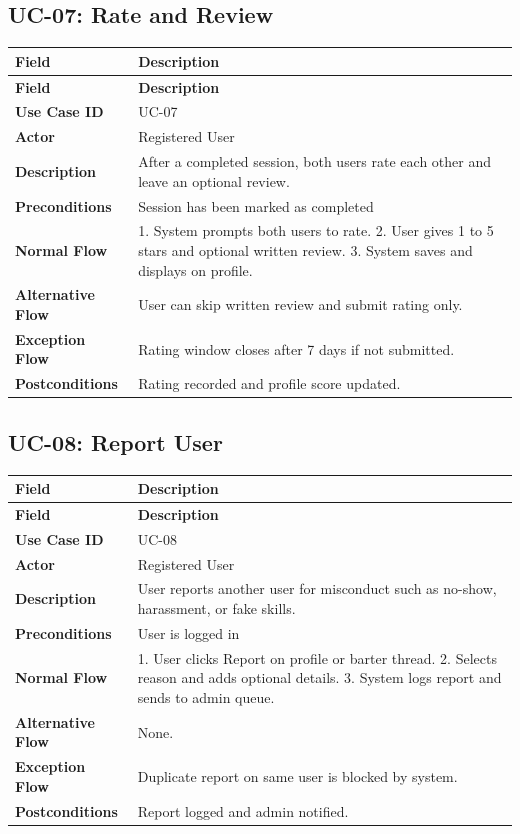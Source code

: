 \documentclass[12pt,a4paper]{article}
\begin{document}
\subsection*{UC-07: Rate and Review}
\begin{longtable}{>{\bfseries}L{3.5cm} L{10cm}}
\toprule
\textbf{Field} & \textbf{Description} \\ \midrule \endfirsthead \midrule \textbf{Field} & \textbf{Description} \\ \midrule \endhead \bottomrule \endfoot
Use Case ID      & UC-07 \\
Actor            & Registered User \\
Description      & After a completed session, both users rate each other and leave an optional review. \\
Preconditions    & Session has been marked as completed \\
Normal Flow      & 1. System prompts both users to rate. 2. User gives 1 to 5 stars and optional written review. 3. System saves and displays on profile. \\
Alternative Flow & User can skip written review and submit rating only. \\
Exception Flow   & Rating window closes after 7 days if not submitted. \\
Postconditions   & Rating recorded and profile score updated. \\
\end{longtable}

\subsection*{UC-08: Report User}
\begin{longtable}{>{\bfseries}L{3.5cm} L{10cm}}
\toprule
\textbf{Field} & \textbf{Description} \\ \midrule \endfirsthead \midrule \textbf{Field} & \textbf{Description} \\ \midrule \endhead \bottomrule \endfoot
Use Case ID      & UC-08 \\
Actor            & Registered User \\
Description      & User reports another user for misconduct such as no-show, harassment, or fake skills. \\
Preconditions    & User is logged in \\
Normal Flow      & 1. User clicks Report on profile or barter thread. 2. Selects reason and adds optional details. 3. System logs report and sends to admin queue. \\
Alternative Flow & None. \\
Exception Flow   & Duplicate report on same user is blocked by system. \\
Postconditions   & Report logged and admin notified. \\
\end{longtable}
\end{document}
